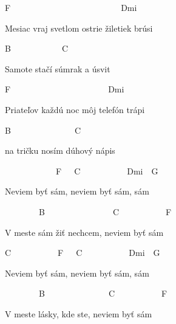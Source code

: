 F~~~~~~~~~~~~~~~~~~~~~~~~~~Dmi

Mesiac vraj svetlom ostrie žiletiek brúsi

B~~~~~~~~~~~~C

Samote stačí súmrak a úsvit

F~~~~~~~~~~~~~~~~~~~~~~~Dmi

Priateľov každú noc môj telefón trápi

B~~~~~~~~~~~~~~~C

na tričku nosím dúhový nápis

\bigskip

\chorus

\begin{chorustext}
~~~~~~~~~~~~F~~~C~~~~~~~~~~~Dmi~~G

Neviem byť sám, neviem byť sám, sám

~~~~~~~~B~~~~~~~~~~~~~~~~C~~~~~~~~~~~F

V meste sám žiť nechcem, neviem byť sám

C~~~~~~~~~~~F~~~C~~~~~~~~~~~Dmi~~G

Neviem byť sám, neviem byť sám, sám

~~~~~~~~B~~~~~~~~~~~~~~~C~~~~~~~~~~~F

V meste lásky, kde ste, neviem byť sám
\end{chorustext}